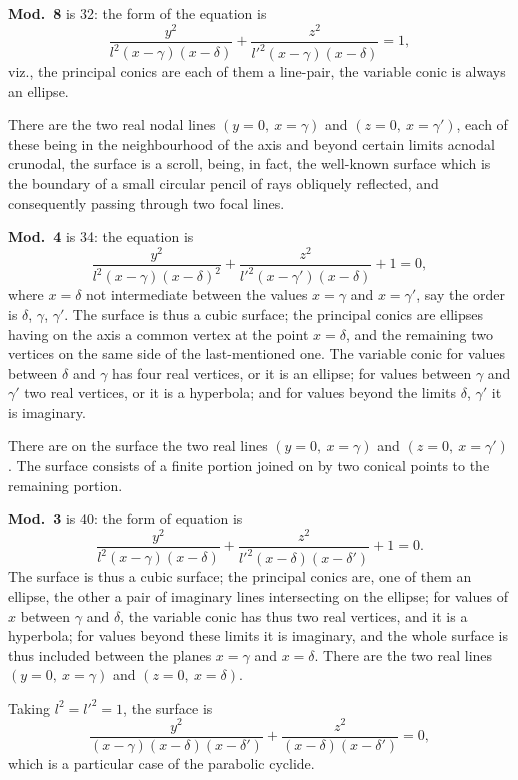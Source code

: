 \documentclass[11pt,a4paper]{article}
\begin{document}
\textbf{Mod.~8} is 32: the form of the equation is
\[
\frac{y^{2}}{l^{2}(x-\gamma)(x-\delta)} + \frac{z^{2}}{l'^{2}(x-\gamma)(x-\delta)} = 1,
\]
viz., the principal conics are each of them a line-pair, the variable conic is always an ellipse.

There are the two real nodal lines $(y=0,\ x=\gamma)$ and $(z=0,\ x=\gamma')$, each of these being in the neighbourhood of the axis and beyond certain limits acnodal crunodal, the surface is a scroll, being, in fact, the well-known surface which is the boundary of a small circular pencil of rays obliquely reflected, and consequently passing through two focal lines.

\textbf{Mod.~4} is 34: the equation is
\[
\frac{y^{2}}{l^{2}(x-\gamma)(x-\delta)^{2}} + \frac{z^{2}}{l'^{2}(x-\gamma')(x-\delta)} + 1 = 0,
\]
where $x=\delta$ not intermediate between the values $x=\gamma$ and $x=\gamma'$, say the order is $\delta$, $\gamma$, $\gamma'$. The surface is thus a cubic surface; the principal conics are ellipses having on the axis a common vertex at the point $x=\delta$, and the remaining two vertices on the same side of the last-mentioned one. The variable conic for values between $\delta$ and $\gamma$ has four real vertices, or it is an ellipse; for values between $\gamma$ and $\gamma'$ two real vertices, or it is a hyperbola; and for values beyond the limits $\delta$, $\gamma'$ it is imaginary.

There are on the surface the two real lines $(y=0,\ x=\gamma)$ and $(z=0,\ x=\gamma')$. The surface consists of a finite portion joined on by two conical points to the remaining portion.

\newpage
\setcounter{page}{302}

\textbf{Mod.~3} is 40: the form of equation is
\[
\frac{y^{2}}{l^{2}(x-\gamma)(x-\delta)} + \frac{z^{2}}{l'^{2}(x-\delta)(x-\delta')} + 1 = 0.
\]
The surface is thus a cubic surface; the principal conics are, one of them an ellipse, the other a pair of imaginary lines intersecting on the ellipse; for values of $x$ between $\gamma$ and $\delta$, the variable conic has thus two real vertices, and it is a hyperbola; for values beyond these limits it is imaginary, and the whole surface is thus included between the planes $x=\gamma$ and $x=\delta$. There are the two real lines $(y=0,\ x=\gamma)$ and $(z=0,\ x=\delta)$.

Taking $l^{2}=l'^{2}=1$, the surface is
\[
\frac{y^{2}}{(x-\gamma)(x-\delta)(x-\delta')} + \frac{z^{2}}{(x-\delta)(x-\delta')} = 0,
\]
which is a particular case of the parabolic cyclide.
\end{document}
